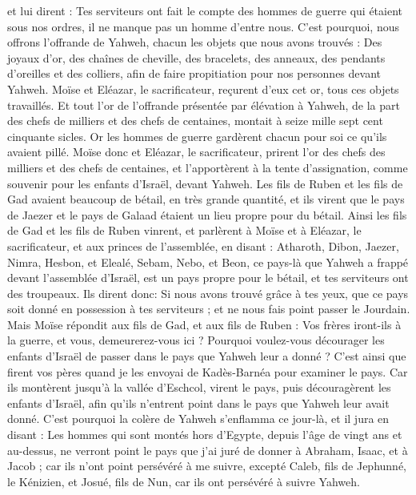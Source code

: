 \begin{multicols}{2}
et lui dirent : Tes serviteurs ont fait le compte des hommes de guerre qui étaient sous nos ordres, il ne manque pas un homme d'entre nous.
C'est pourquoi, nous offrons l'offrande de Yahweh, chacun les objets que nous avons trouvés : Des joyaux d'or, des chaînes de cheville, des bracelets, des anneaux, des pendants d'oreilles et des colliers, afin de faire propitiation pour nos personnes devant Yahweh.
Moïse et Eléazar, le sacrificateur, reçurent d'eux cet or, tous ces objets travaillés.
Et tout l'or de l'offrande présentée par élévation à Yahweh, de la part des chefs de milliers et des chefs de centaines, montait à seize mille sept cent cinquante sicles.
Or les hommes de guerre gardèrent chacun pour soi ce qu'ils avaient pillé.
Moïse donc et Eléazar, le sacrificateur, prirent l'or des chefs des milliers et des chefs de centaines, et l'apportèrent à la tente d'assignation, comme souvenir pour les enfants d'Israël, devant Yahweh.
\VerseOne{}Les fils de Ruben et les fils de Gad avaient beaucoup de bétail, en très grande quantité, et ils virent que le pays de Jaezer et le pays de Galaad étaient un lieu propre pour du bétail.
Ainsi les fils de Gad et les fils de Ruben vinrent, et parlèrent à Moïse et à Eléazar, le sacrificateur, et aux princes de l'assemblée, en disant :
Atharoth, Dibon, Jaezer, Nimra, Hesbon, et Elealé, Sebam, Nebo, et Beon,
ce pays-là que Yahweh a frappé devant l'assemblée d'Israël, est un pays propre pour le bétail, et tes serviteurs ont des troupeaux.
Ils dirent donc: Si nous avons trouvé grâce à tes yeux, que ce pays soit donné en possession à tes serviteurs ; et ne nous fais point passer le Jourdain.
Mais Moïse répondit aux fils de Gad, et aux fils de Ruben : Vos frères iront-ils à la guerre, et vous, demeurerez-vous ici ?
Pourquoi voulez-vous décourager les enfants d'Israël de passer dans le pays que Yahweh leur a donné ?
C'est ainsi que firent vos pères quand je les envoyai de Kadès-Barnéa pour examiner le pays.
Car ils montèrent jusqu'à la vallée d'Eschcol, virent le pays, puis découragèrent les enfants d'Israël, afin qu'ils n'entrent point dans le pays que Yahweh leur avait donné.
C'est pourquoi la colère de Yahweh s'enflamma ce jour-là, et il jura en disant :
Les hommes qui sont montés hors d'Egypte, depuis l'âge de vingt ans et au-dessus, ne verront point le pays que j'ai juré de donner à Abraham, Isaac, et à Jacob ; car ils n’ont point persévéré à me suivre,
excepté Caleb, fils de Jephunné, le Kénizien, et Josué, fils de Nun,  car ils ont persévéré à suivre Yahweh.

\end{multicols}
